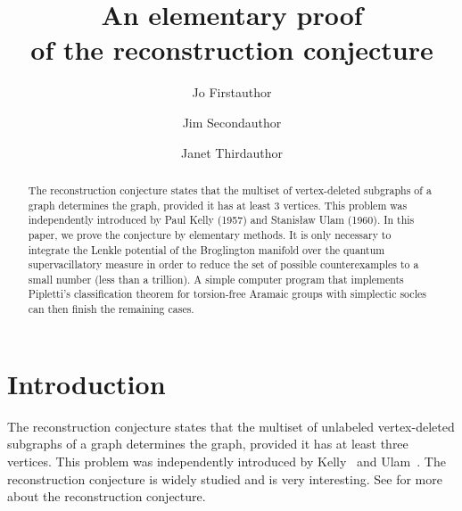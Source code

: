 \documentclass[12pt]{article}
\title{An elementary proof\\ of the reconstruction conjecture}
\author{Jo Firstauthor\authornote{1}
\and
Jim Secondauthor\authornote{2}
\and
Janet Thirdauthor\authornote{1,2}
}
\begin{document}
\maketitle


\begin{abstract}
  The reconstruction conjecture states that the multiset of 
  vertex-deleted subgraphs of a graph determines the graph, provided
  it has at least 3 vertices.  This problem was independently introduced
  by Paul Kelly (1957) and Stanis\l aw Ulam (1960). In this paper,
  we prove the conjecture by elementary methods. 
  It is only necessary
  to integrate the Lenkle potential of the Broglington manifold over
  the quantum supervacillatory measure in order to reduce the set of
  possible counterexamples to a small number (less than a trillion).
  A simple computer program that implements Pipletti's classification
  theorem for torsion-free Aramaic groups with simplectic socles can
  then finish the remaining cases.
\end{abstract}

\section{Introduction}

The reconstruction conjecture states that the multiset of unlabeled
vertex-deleted subgraphs of a graph determines the graph, provided it
has at least three vertices.  This problem was independently introduced
by Kelly~\cite{Kelly} and Ulam~\cite{Ulam}.   The reconstruction
conjecture is widely studied
\cite{Bollobas,FGH,HHRT,KSU,Stockmeyer,WS} and is very interesting.
See \cite{BH} for more about the reconstruction conjecture.
\end{document}
